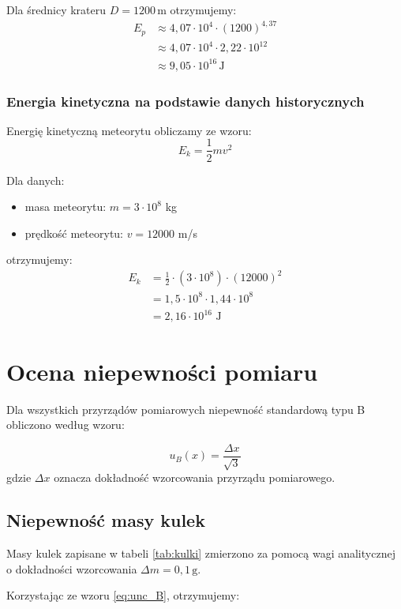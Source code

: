 \documentclass[a4paper,12pt]{article}
\begin{document}
Dla średnicy krateru \( D = 1200 \, \text{m} \) otrzymujemy:
\begin{align*}
E_p &\approx 4,07 \cdot 10^4 \cdot (1200)^{4,37} \\
&\approx 4,07 \cdot 10^4 \cdot 2,22 \cdot 10^{12} \\
&\approx 9,05 \cdot 10^{16} \, \text{J}
\end{align*}

\subsubsection{Energia kinetyczna na podstawie danych historycznych}

Energię kinetyczną meteorytu obliczamy ze wzoru:
\[
E_k = \frac{1}{2} m v^2
\]

Dla danych:
\begin{itemize}
    \item masa meteorytu: \( m = 3 \cdot 10^8 \) kg
    \item prędkość meteorytu: \( v = 12000 \) m/s
\end{itemize}

otrzymujemy:
\begin{align*}
E_k &= \frac{1}{2} \cdot (3 \cdot 10^8) \cdot (12000)^2 \\
&= 1,5 \cdot 10^8 \cdot 1,44 \cdot 10^8 \\
&= 2,16 \cdot 10^{16} \text{ J}
\end{align*}

\section{Ocena niepewności pomiaru}

Dla wszystkich przyrządów pomiarowych niepewność standardową typu B obliczono według wzoru:

\begin{equation}
    \label{eq:unc_B}
    u_B(x) = \frac{\Delta x}{\sqrt{3}}
\end{equation}
gdzie $\Delta x$ oznacza dokładność wzorcowania przyrządu pomiarowego.

\subsection{Niepewność masy kulek}
Masy kulek zapisane w tabeli \ref{tab:kulki} zmierzono za pomocą wagi analitycznej o dokładności wzorcowania $\Delta m = 0,1 \, \text{g}$. 

Korzystając ze wzoru \eqref{eq:unc_B}, otrzymujemy:
\end{document}
